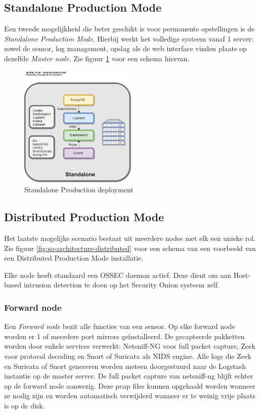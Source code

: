 \documentclass[a4paper,12pt]{report}
\begin{document}
\subsection{Standalone Production Mode}
Een tweede mogelijkheid die beter geschikt is voor permanente opstellingen is de \emph{Standalone Production Mode}.
Hierbij werkt het volledige systeem vanaf 1 server: zowel de sensor, log management, opslag als de web interface vinden plaats op dezelfde \emph{Master node}.
Zie figuur \ref{fig:so-architecture-standalone} voor een schema hiervan.
\begin{figure}[H]
  \centering
  \includegraphics[width=0.5\textwidth]{so-architecture-production-standalone}
  \caption{Standalone Production deployment \autocite{so:docs}}
  \label{fig:so-architecture-standalone}
\end{figure}

\subsection{Distributed Production Mode}
Het laatste mogelijke scenario bestaat uit meerdere nodes met elk een unieke rol.
Zie figuur \ref{fig:so-architecture-distributed} voor een schema van een voorbeeld van een Distributed Production Mode installatie.

Elke node heeft standaard een OSSEC daemon actief.
Deze dient om aan Host-based intrusion detection te doen op het Security Onion systeem zelf.

\subsubsection{Forward node}
Een \emph{Forward node} bezit alle functies van een sensor.
Op elke forward node worden er 1 of meerdere port mirrors geïnstalleerd.
De gecapteerde pakketten worden door enkele services verwerkt: Netsniff-NG voor full packet capture, Zeek voor protocol decoding en Snort of Suricata als NIDS engine.
Alle logs die Zeek en Suricata of Snort genereren worden meteen doorgestuurd naar de Logstash instantie op de master server.
De full packet capture van netsniff-ng blijft echter op de forward node aanwezig.
Deze pcap files kunnen opgehaald worden wanneer ze nodig zijn en worden automatisch verwijderd wanneer er te weinig vrije plaats is op de disk.
\end{document}

